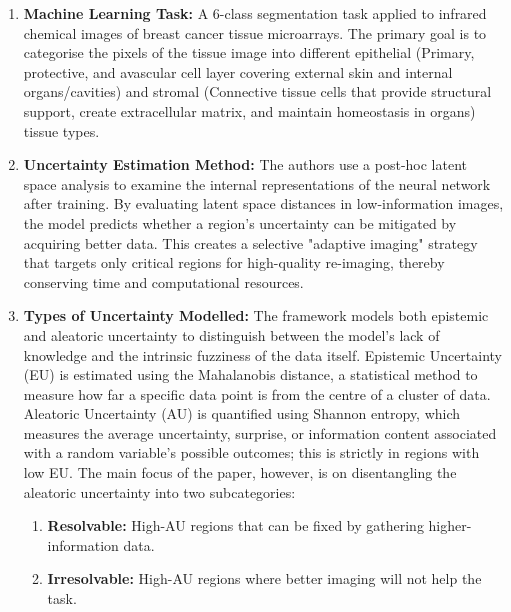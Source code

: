 \documentclass{article}
\begin{document}
\begin{enumerate}
    \item \textbf{Machine Learning Task:} A 6-class segmentation task applied to infrared chemical images of breast cancer tissue microarrays. The primary goal is to categorise the pixels of the tissue image into different epithelial (Primary, protective, and avascular cell layer covering external skin and internal organs/cavities) and stromal (Connective tissue cells that provide structural support, create extracellular matrix, and maintain homeostasis in organs) tissue types.
    \item \textbf{Uncertainty Estimation Method:} The authors use a post-hoc latent space analysis to examine the internal representations of the neural network after training. By evaluating latent space distances in low-information images, the model predicts whether a region's uncertainty can be mitigated by acquiring better data. This creates a selective "adaptive imaging" strategy that targets only critical regions for high-quality re-imaging, thereby conserving time and computational resources.
    \item \textbf{Types of Uncertainty Modelled:} The framework models both epistemic and aleatoric uncertainty to distinguish between the model's lack of knowledge and the intrinsic fuzziness of the data itself. Epistemic Uncertainty (EU) is estimated using the Mahalanobis distance, a statistical method to measure how far a specific data point is from the centre of a cluster of data. Aleatoric Uncertainty (AU) is quantified using Shannon entropy, which measures the average uncertainty, surprise, or information content associated with a random variable's possible outcomes; this is strictly in regions with low EU. The main focus of the paper, however, is on disentangling the aleatoric uncertainty into two subcategories:
    \begin{enumerate}
        \item \textbf{Resolvable:} High-AU regions that can be fixed by gathering higher-information data.
        \item \textbf{Irresolvable:} High-AU regions where better imaging will not help the task.
    \end{enumerate}
\end{enumerate}


\newpage

\end{document}

